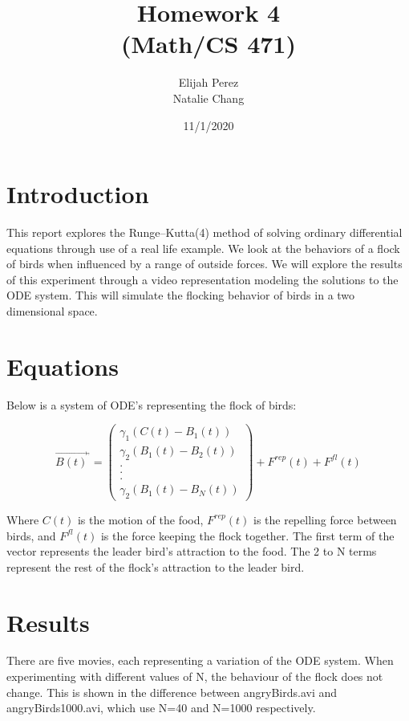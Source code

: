 \documentclass[12pt]{article}
\title{Homework 4 \protect \\(Math/CS 471)}
\author{Elijah Perez \protect \newline \\ Natalie Chang}
\date{\vfill 11/1/2020}
\begin{document}
	\maketitle
	\pagebreak
	
	\section{Introduction}
    This report explores the Runge–Kutta(4) method of solving ordinary differential equations through use of a real life example. We look at the behaviors of a flock of birds when influenced by a range of outside forces. We will explore the results of this experiment through a video representation modeling the solutions to the ODE system. This will simulate the flocking behavior of birds in a two dimensional space.
	
	\section{Equations}
	Below is a system of ODE's representing the flock of birds:
	\begin{center}
	\begin{equation}
		\vec{B(t)}^,=\begin{pmatrix}
			\gamma_1(C(t)-B_1(t)) \\
			\gamma_2(B_1(t)-B_2(t))\\
			.\\
			.\\
			.\\
			\gamma_2(B_1(t)-B_N(t))
		\end{pmatrix} + F^{rep}(t)+F^{fl}(t)
	\end{equation}
    \end{center}
	Where $C(t)$ is the motion of the food,	$F^{rep}(t)$ is the repelling force between birds, and $F^{fl}(t)$ is the force keeping the flock together. The first term of the vector represents the leader bird's attraction to the food. The 2 to N terms represent the rest of the flock's attraction to the leader bird. 
	
	
	\section{Results}
	There are five movies, each representing a variation of the ODE system. When experimenting with different values of N, the behaviour of the flock does not change. This is shown in the difference between angryBirds.avi and angryBirds1000.avi, which use N=40 and N=1000 respectively.
\end{document}
